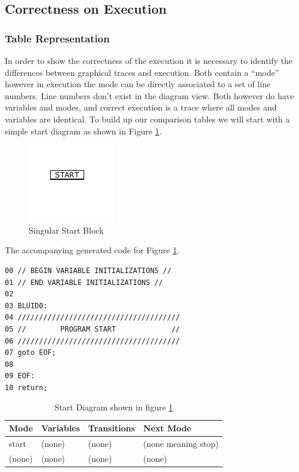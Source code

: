\subsection{Correctness on Execution}

\subsubsection{Table Representation}

In order to show the correctness of the execution it is necessary to identify the differences between graphical traces and execution. Both contain a ``mode'' however in execution the mode can be directly associated to a set of line numbers. Line numbers don't exist in the diagram view. Both however do have variables and modes, and correct execution is a trace where all modes and variables are identical. To build up our comparison tables we will start with a simple start diagram as shown in Figure \ref{fig:correctness_ex_start}.

\clearpage
\begin{figure}[h]
	\centering
	\includegraphics[width=\imgsmall]{./images/correctness_ex_start.png}
	\caption{Singular Start Block}
	\label{fig:correctness_ex_start}
\end{figure}


The accompanying generated  code for Figure \ref{fig:correctness_ex_start}.

\begin{lstlisting}[frame=single]
00 // BEGIN VARIABLE INITIALIZATIONS //
01 // END VARIABLE INITIALIZATIONS //
02
03 BLUID0:
04 //////////////////////////////////////
05 //        PROGRAM START             //
06 //////////////////////////////////////
07 goto EOF;
08 
09 EOF:
10 return;
\end{lstlisting}

\begin{table}[htcb]
	\caption{Start Diagram shown in figure \ref{fig:correctness_ex_start}}
	\centering
		\begin{tabular}{| l | l | l | l |}
			\hline
			\textbf{Mode} & \textbf{Variables} & \textbf{Transitions} & \textbf{Next Mode} \\
			\hline
			start & (none) & (none) & (none meaning stop) \\
			\hline
			(none) & (none) & (none) & (none) \\
			\hline
		\end{tabular}
	\label{table:BasicDiagOnly}
\end{table}

